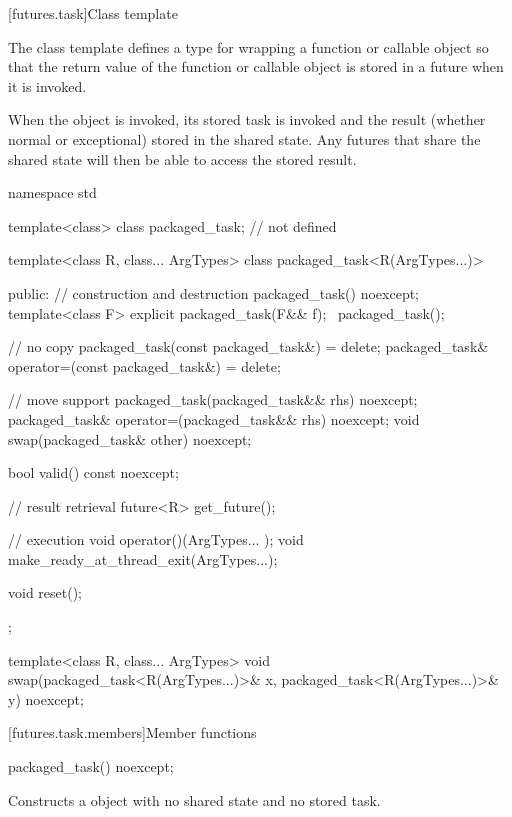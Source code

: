 [futures.task]{Class template }

\pnum
The class template  defines a type for wrapping a function or
callable object so that the return value of the function or callable object is stored in
a future when it is invoked.

\pnum
When the  object is invoked, its stored task is invoked and the
result (whether normal or exceptional) stored in the shared state. Any futures that
share the shared state will then be able to access the stored result.

%
\begin{codeblock}
namespace std {
  template<class> class packaged_task; // not defined

  template<class R, class... ArgTypes>
  class packaged_task<R(ArgTypes...)> {
  public:
    // construction and destruction
    packaged_task() noexcept;
    template<class F>
      explicit packaged_task(F&& f);
    ~packaged_task();

    // no copy
    packaged_task(const packaged_task&) = delete;
    packaged_task& operator=(const packaged_task&) = delete;

    // move support
    packaged_task(packaged_task&& rhs) noexcept;
    packaged_task& operator=(packaged_task&& rhs) noexcept;
    void swap(packaged_task& other) noexcept;

    bool valid() const noexcept;

    // result retrieval
    future<R> get_future();

    // execution
    void operator()(ArgTypes... );
    void make_ready_at_thread_exit(ArgTypes...);

    void reset();
  };

  template<class R, class... ArgTypes>
    void swap(packaged_task<R(ArgTypes...)>& x, packaged_task<R(ArgTypes...)>& y) noexcept;
}
\end{codeblock}

[futures.task.members]{Member functions}

%
\begin{itemdecl}
packaged_task() noexcept;
\end{itemdecl}

\begin{itemdescr}
\pnum
\effects Constructs a  object with no shared state and no stored task.
\end{itemdescr}


